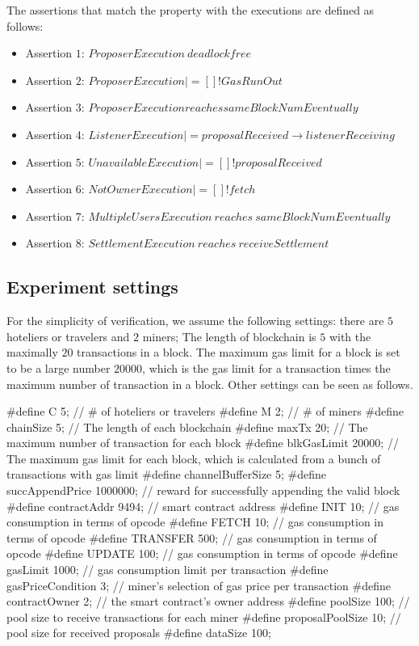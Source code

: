 \documentclass{KERauth}
\begin{document}
The assertions that match the property with the executions are defined as follows:
\begin{itemize}
    \item Assertion $1$: $ProposerExecution\ deadlockfree$
    \item Assertion $2$: $ProposerExecution |= []! GasRunOut$
    \item Assertion $3$: $ProposerExecution reaches sameBlockNumEventually$
    \item Assertion $4$: $ListenerExecution |= proposalReceived \rightarrow listenerReceiving$
    \item Assertion $5$: $UnavailableExecution |= []! proposalReceived$
    \item Assertion $6$: $NotOwnerExecution |= []! fetch$
    \item Assertion $7$: $MultipleUsersExecution\ reaches\ sameBlockNumEventually$
    \item Assertion $8$: $SettlementExecution\ reaches\ receiveSettlement$
\end{itemize}

\subsection{Experiment settings}

For the simplicity of verification, we assume the following settings: there are $5$ hoteliers or travelers and $2$ miners; The length of blockchain is $5$ with the maximally $20$ transactions in a block. The maximum gas limit for a block is set to be a large number $20000$, which is the gas limit for a transaction times the maximum number of transaction in a block. Other settings can be seen as follows.

\begin{center}
\begin{boxedverbatim}
#define C 5; // # of hoteliers or travelers
#define M 2; // # of miners
#define chainSize 5; // The length of each blockchain
#define maxTx 20; // The maximum number of transaction for each block
#define blkGasLimit 20000; // The maximum gas limit for each block, which is
calculated from a bunch of transactions with gas limit
#define channelBufferSize 5;
#define succAppendPrice 1000000; // reward for successfully appending the
valid block
#define contractAddr 9494; // smart contract address
#define INIT 10; // gas consumption in terms of opcode
#define FETCH 10; // gas consumption in terms of opcode
#define TRANSFER 500; // gas consumption in terms of opcode
#define UPDATE 100; // gas consumption in terms of opcode
#define gasLimit 1000; // gas consumption limit per transaction
#define gasPriceCondition 3; // miner's selection of gas price per transaction
#define contractOwner 2; // the smart contract's owner address
#define poolSize 100; // pool size to receive transactions for each miner
#define proposalPoolSize 10; // pool size for received proposals
#define dataSize 100;
\end{boxedverbatim}
\end{center}
\end{document}
